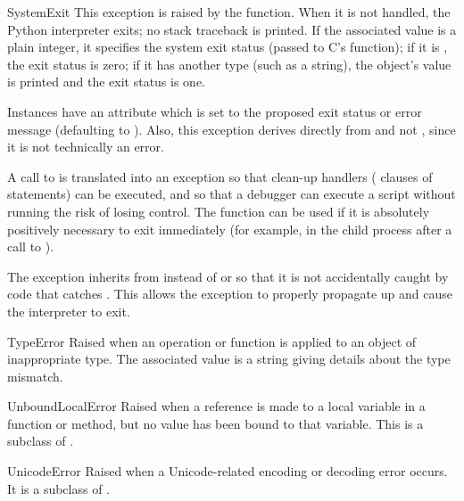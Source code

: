 \begin{excdesc}{SystemExit}
  This exception is raised by the  function.  When it
  is not handled, the Python interpreter exits; no stack traceback is
  printed.  If the associated value is a plain integer, it specifies the
  system exit status (passed to C's  function); if it is
  , the exit status is zero; if it has another type (such as
  a string), the object's value is printed and the exit status is one.

  Instances have an attribute  which is set to the
  proposed exit status or error message (defaulting to ).
  Also, this exception derives directly from  and
  not , since it is not technically an error.

  A call to  is translated into an exception so that
  clean-up handlers ( clauses of  statements)
  can be executed, and so that a debugger can execute a script without
  running the risk of losing control.  The  function
  can be used if it is absolutely positively necessary to exit
  immediately (for example, in the child process after a call to
  ).

  The exception inherits from  instead of
   or  so that it is not
  accidentally caught by code that catches .  This allows
  the exception to properly propagate up and cause the interpreter to exit.
\end{excdesc}

\begin{excdesc}{TypeError}
  Raised when an operation or function is applied to an object
  of inappropriate type.  The associated value is a string giving
  details about the type mismatch.
\end{excdesc}

\begin{excdesc}{UnboundLocalError}
  Raised when a reference is made to a local variable in a function or
  method, but no value has been bound to that variable.  This is a
  subclass of .
\end{excdesc}

\begin{excdesc}{UnicodeError}
  Raised when a Unicode-related encoding or decoding error occurs.  It
  is a subclass of .
\end{excdesc}

